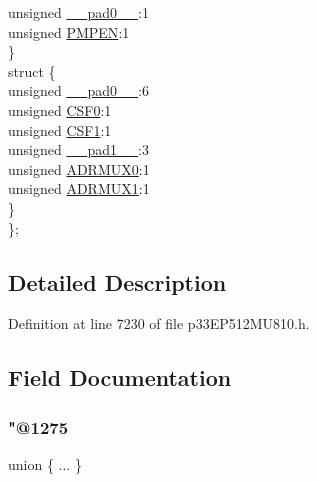 \begin{DoxyCompactItemize}
\begin{tabbing}
\>\>unsigned \hyperlink{structtag_p_m_c_o_n_b_i_t_s_adf71f3d8410c1f1dbbc96680a92c49af}{\_\_pad0\_\_}:1\\
\>\>unsigned \hyperlink{structtag_p_m_c_o_n_b_i_t_s_a176535e6b0fbffd82f94824937dd1890}{PMPEN}:1\\
\>\} \\
\>struct \{\\
\>\>unsigned \hyperlink{structtag_p_m_c_o_n_b_i_t_s_adf71f3d8410c1f1dbbc96680a92c49af}{\_\_pad0\_\_}:6\\
\>\>unsigned \hyperlink{structtag_p_m_c_o_n_b_i_t_s_ab12b0dec6c776c1164c3bc6846b0df3f}{CSF0}:1\\
\>\>unsigned \hyperlink{structtag_p_m_c_o_n_b_i_t_s_a36baa4cc6ac73b4301ab49f1a3f20e5b}{CSF1}:1\\
\>\>unsigned \hyperlink{structtag_p_m_c_o_n_b_i_t_s_acaf2d0924a107ec6e8d2e31febaf66f9}{\_\_pad1\_\_}:3\\
\>\>unsigned \hyperlink{structtag_p_m_c_o_n_b_i_t_s_afd85a9b4b10d4205e4dbbed5818dc9fd}{ADRMUX0}:1\\
\>\>unsigned \hyperlink{structtag_p_m_c_o_n_b_i_t_s_a7c2659da0aba4360570969ff1e5889ba}{ADRMUX1}:1\\
\>\} \\
\}; \\

\end{tabbing}\end{DoxyCompactItemize}


\subsection{Detailed Description}


Definition at line 7230 of file p33\+E\+P512\+M\+U810.\+h.



\subsection{Field Documentation}
\mbox{\label{structtag_p_m_c_o_n_b_i_t_s_a02a063dab56ae429e0b303c47560c0ca}} 
\subsubsection{\texorpdfstring{"@1275}{@1275}}
{\footnotesize\ttfamily union \{ ... \} }

\mbox{\label{structtag_p_m_c_o_n_b_i_t_s_adf71f3d8410c1f1dbbc96680a92c49af}} 
